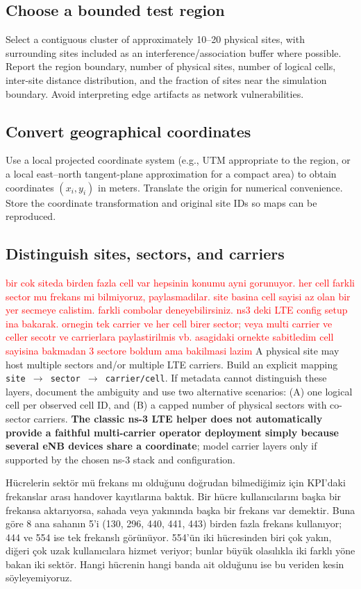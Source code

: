 \documentclass[11pt,a4paper]{article}
\newcommand{\red}[1]{\textcolor{red}{#1}}
\newenvironment{progress}{\par\smallskip\color{blue}}{\par\smallskip}
\begin{document}
\subsection{Choose a bounded test region}
Select a contiguous cluster of approximately 10--20 physical sites, with surrounding sites included as an interference/association buffer where possible. Report the region boundary, number of physical sites, number of logical cells, inter-site distance distribution, and the fraction of sites near the simulation boundary. Avoid interpreting edge artifacts as network vulnerabilities.

\subsection{Convert geographical coordinates}
Use a local projected coordinate system (e.g., UTM appropriate to the region, or a local east--north tangent-plane approximation for a compact area) to obtain coordinates $(x_i,y_i)$ in meters. Translate the origin for numerical convenience. Store the coordinate transformation and original site IDs so maps can be reproduced.

\subsection{Distinguish sites, sectors, and carriers}
\red{bir cok siteda birden fazla cell var hepsinin konumu ayni gorunuyor. her cell farkli sector mu frekans mi bilmiyoruz, paylasmadilar. site basina cell sayisi az olan bir yer secmeye calistim. farkli combolar deneyebilirsiniz. ns3 deki LTE config setup ina bakarak. ornegin tek carrier ve her cell birer sector; veya multi carrier ve celler secotr ve carrierlara paylastirilmis vb. asagidaki ornekte sabitledim cell sayisina bakmadan 3 sectore boldum ama bakilmasi lazim}
A physical site may host multiple sectors and/or multiple LTE carriers. Build an explicit mapping \texttt{site $\rightarrow$ sector $\rightarrow$ carrier/cell}. If metadata cannot distinguish these layers, document the ambiguity and use two alternative scenarios: (A) one logical cell per observed cell ID, and (B) a capped number of physical sectors with co-sector carriers. \textbf{The classic ns-3 LTE helper does not automatically provide a faithful multi-carrier operator deployment simply because several eNB devices share a coordinate}; model carrier layers only if supported by the chosen ns-3 stack and configuration.

\begin{progress}
Hücrelerin sektör mü frekans mı olduğunu doğrudan bilmediğimiz için KPI'daki frekanslar arası handover kayıtlarına baktık. Bir hücre kullanıcılarını başka bir frekansa aktarıyorsa, sahada veya yakınında başka bir frekans var demektir. Buna göre 8 ana sahanın 5'i (130, 296, 440, 441, 443) birden fazla frekans kullanıyor; 444 ve 554 ise tek frekanslı görünüyor. 554'ün iki hücresinden biri çok yakın, diğeri çok uzak kullanıcılara hizmet veriyor; bunlar büyük olasılıkla iki farklı yöne bakan iki sektör. Hangi hücrenin hangi banda ait olduğunu ise bu veriden kesin söyleyemiyoruz.
\end{progress}
\end{document}
